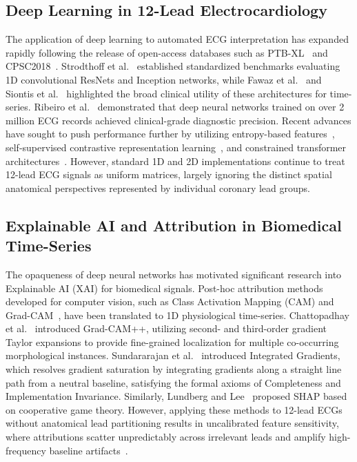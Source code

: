 \documentclass[5p,twocolumn,10pt]{elsarticle}
\begin{document}
\subsection{Deep Learning in 12-Lead Electrocardiology}
The application of deep learning to automated ECG interpretation has expanded rapidly following the release of open-access databases such as PTB-XL~\cite{wagner2020ptb} and CPSC2018~\cite{liu2018open}. Strodthoff et al.~\cite{strodthoff2020deep} established standardized benchmarks evaluating 1D convolutional ResNets and Inception networks, while Fawaz et al.~\cite{fawaz2019deep} and Siontis et al.~\cite{siontis2021artificial} highlighted the broad clinical utility of these architectures for time-series. Ribeiro et al.~\cite{ribeiro2020automatic} demonstrated that deep neural networks trained on over 2 million ECG records achieved clinical-grade diagnostic precision. Recent advances have sought to push performance further by utilizing entropy-based features~\cite{smigiel2021ecg}, self-supervised contrastive representation learning~\cite{mehari2022self}, and constrained transformer architectures~\cite{che2021constrained}. However, standard 1D and 2D implementations continue to treat 12-lead ECG signals as uniform matrices, largely ignoring the distinct spatial anatomical perspectives represented by individual coronary lead groups.

\subsection{Explainable AI and Attribution in Biomedical Time-Series}
The opaqueness of deep neural networks has motivated significant research into Explainable AI (XAI) for biomedical signals. Post-hoc attribution methods developed for computer vision, such as Class Activation Mapping (CAM) and Grad-CAM~\cite{selvaraju2017grad}, have been translated to 1D physiological time-series. Chattopadhay et al.~\cite{chattopadhay2018grad} introduced Grad-CAM++, utilizing second- and third-order gradient Taylor expansions to provide fine-grained localization for multiple co-occurring morphological instances. Sundararajan et al.~\cite{sundararajan2017axiomatic} introduced Integrated Gradients, which resolves gradient saturation by integrating gradients along a straight line path from a neutral baseline, satisfying the formal axioms of Completeness and Implementation Invariance. Similarly, Lundberg and Lee~\cite{lundberg2017unified} proposed SHAP based on cooperative game theory. However, applying these methods to 12-lead ECGs without anatomical lead partitioning results in uncalibrated feature sensitivity, where attributions scatter unpredictably across irrelevant leads and amplify high-frequency baseline artifacts~\cite{ismail2020benchmarking, tonekaboni2020went}.
\end{document}
